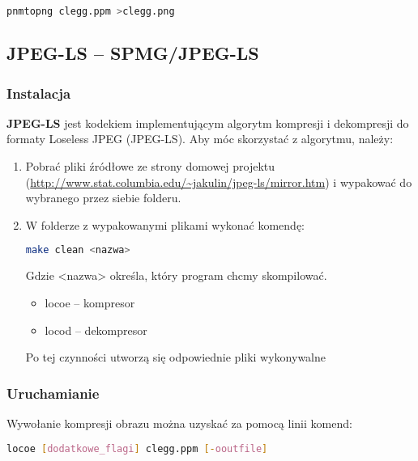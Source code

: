 \begin{lstlisting}[language=bash]
	pnmtopng clegg.ppm >clegg.png
\end{lstlisting}

\subsection{JPEG-LS -- SPMG/JPEG-LS}

\subsubsection{Instalacja}

\textbf{JPEG-LS} jest kodekiem implementującym algorytm kompresji i dekompresji do formaty Loseless JPEG (JPEG-LS). Aby móc skorzystać z algorytmu, należy:

\begin{enumerate}
	\item Pobrać pliki źródłowe ze strony domowej projektu (\url{http://www.stat.columbia.edu/~jakulin/jpeg-ls/mirror.htm}) i wypakować do wybranego przez siebie folderu.
	\item W folderze z wypakowanymi plikami wykonać komendę:
	
	\begin{lstlisting}[language=bash]
	make clean <nazwa>
	\end{lstlisting}
	
	Gdzie <nazwa> określa, który program chcmy skompilować.
	
	\begin{itemize}
		\item locoe -- kompresor
		\item locod -- dekompresor
	\end{itemize}
	
	Po tej czynności utworzą się odpowiednie pliki wykonywalne
	
\end{enumerate}

\subsubsection{Uruchamianie}

Wywołanie kompresji obrazu można uzyskać za pomocą linii komend:

\begin{lstlisting}[language=bash]
	locoe [dodatkowe_flagi] clegg.ppm [-ooutfile]
\end{lstlisting}


